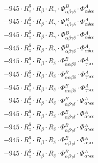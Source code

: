 \documentclass{article}
\begin{document}
\begin{subequations}
\begin{gather}
\begin{array}{c}
 \\[0.2em] 		 - 945 \cdot R_{z}^{6} \cdot R_{\beta{}} \cdot R_{\gamma{}} \cdot \Phi{}^{B}_{\alpha{}\beta{}\gamma{}\delta{}} \cdot \Phi{}^{A}_{\alpha{}\delta{}\epsilon{}\epsilon{}} 
 \\[0.2em] 		 - 945 \cdot R_{z}^{6} \cdot R_{\beta{}} \cdot R_{\gamma{}} \cdot \Phi{}^{B}_{\alpha{}\beta{}\gamma{}\delta{}} \cdot \Phi{}^{A}_{\alpha{}\delta{}\epsilon{}\epsilon{}} 
 \\[0.2em] 		 - 945 \cdot R_{z}^{6} \cdot R_{\beta{}} \cdot R_{\gamma{}} \cdot \Phi{}^{B}_{\alpha{}\beta{}\gamma{}\delta{}} \cdot \Phi{}^{A}_{\alpha{}\delta{}\epsilon{}\epsilon{}} 
 \\[0.2em] 		 - 945 \cdot R_{z}^{6} \cdot R_{\beta{}} \cdot R_{\gamma{}} \cdot \Phi{}^{B}_{\alpha{}\beta{}\gamma{}\delta{}} \cdot \Phi{}^{A}_{\alpha{}\delta{}\epsilon{}\epsilon{}} 
 \\[0.2em] 		 - 945 \cdot R_{z}^{6} \cdot R_{\beta{}} \cdot R_{\delta{}} \cdot \Phi{}^{B}_{\alpha{}\alpha{}\beta{}\delta{}} \cdot \Phi{}^{A}_{\gamma{}\gamma{}\epsilon{}\epsilon{}} 
 \\[0.2em] 		 - 945 \cdot R_{z}^{6} \cdot R_{\beta{}} \cdot R_{\delta{}} \cdot \Phi{}^{B}_{\alpha{}\alpha{}\beta{}\delta{}} \cdot \Phi{}^{A}_{\gamma{}\gamma{}\epsilon{}\epsilon{}} 
 \\[0.2em] 		 - 945 \cdot R_{z}^{6} \cdot R_{\beta{}} \cdot R_{\delta{}} \cdot \Phi{}^{B}_{\alpha{}\alpha{}\beta{}\delta{}} \cdot \Phi{}^{A}_{\gamma{}\gamma{}\epsilon{}\epsilon{}} 
 \\[0.2em] 		 - 945 \cdot R_{z}^{6} \cdot R_{\beta{}} \cdot R_{\delta{}} \cdot \Phi{}^{B}_{\alpha{}\beta{}\gamma{}\delta{}} \cdot \Phi{}^{A}_{\alpha{}\gamma{}\epsilon{}\epsilon{}} 
 \\[0.2em] 		 - 945 \cdot R_{z}^{6} \cdot R_{\beta{}} \cdot R_{\delta{}} \cdot \Phi{}^{B}_{\alpha{}\beta{}\gamma{}\delta{}} \cdot \Phi{}^{A}_{\alpha{}\gamma{}\epsilon{}\epsilon{}} 
 \\[0.2em] 		 - 945 \cdot R_{z}^{6} \cdot R_{\beta{}} \cdot R_{\delta{}} \cdot \Phi{}^{B}_{\alpha{}\beta{}\gamma{}\delta{}} \cdot \Phi{}^{A}_{\alpha{}\gamma{}\epsilon{}\epsilon{}} 
 \\[0.2em] 		 - 945 \cdot R_{z}^{6} \cdot R_{\beta{}} \cdot R_{\delta{}} \cdot \Phi{}^{B}_{\alpha{}\beta{}\gamma{}\delta{}} \cdot \Phi{}^{A}_{\alpha{}\gamma{}\epsilon{}\epsilon{}} 
 \\[0.2em] 		 - 945 \cdot R_{z}^{6} \cdot R_{\beta{}} \cdot R_{\delta{}} \cdot \Phi{}^{B}_{\alpha{}\beta{}\gamma{}\delta{}} \cdot \Phi{}^{A}_{\alpha{}\gamma{}\epsilon{}\epsilon{}} 

\end{array}
\end{gather}
\end{subequations}
\end{document}
